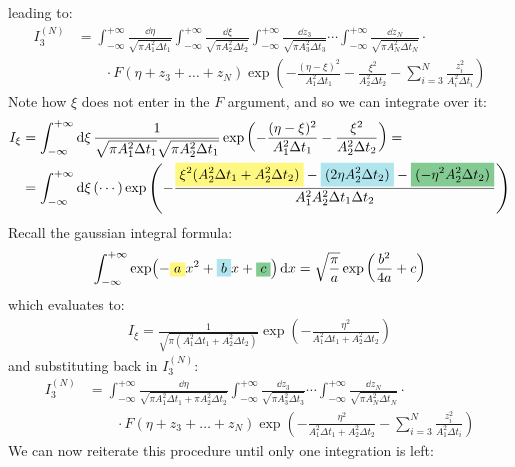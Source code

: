 \documentclass[../template.tex]{subfiles}
\begin{document}
leading to:
\begin{align*}
    I_3^{(N)} &= \int_{-\infty}^{+\infty} \frac{\dd{\eta}}{\sqrt{ \pi A_1^2 \Delta t_1}}\int_{-\infty}^{+\infty} \frac{\dd{\xi}}{\sqrt{ \pi A_2^2 \Delta t_2 }} \int_{-\infty}^{+\infty} \frac{\dd{z_3}}{\sqrt{\pi A_3^2 \Delta t_3}}\cdots \int_{-\infty}^{+\infty} \frac{\dd{z_N}}{\sqrt{\pi A_N^2 \Delta t_N}} \cdot\\
    &\qquad \cdot F(\eta + z_3 + \dots + z_N) \exp\left(-\frac{(\eta-\xi)^2}{A_1^2 \Delta t_1} - \frac{\xi^2}{A_2^2 \Delta t_2} - \sum_{i=3}^N \frac{z_i^2}{A_i^2 \Delta t_i} \right)
\end{align*}
Note how $\xi$ does not enter in the $F$ argument, and so we can integrate over it:
\begin{align*}
    I_\xi &= \int_{-\infty}^{+\infty} \dd{\xi} \frac{1}{\sqrt{\pi A_1^2 \Delta t_1} \sqrt{\pi A_2^2 \Delta t_1 }}\exp\left(-\frac{(\eta - \xi)^2}{A_1^2 \Delta t_1} - \frac{\xi^2}{A_2^2 \Delta t_2} \right) =\\
    &= \int_{-\infty}^{+\infty} \dd{\xi} (\cdots) \exp\left(-\frac{\hlc{Yellow}{\xi^2 (A_2^2 \Delta t_1 + A_2^2 \Delta t_2)} - \hlc{SkyBlue}{(2\eta A_2^2 \Delta t_2)} - \hlc{ForestGreen}{(-\eta^2 A_2^2 \Delta t_2)}}{A_1^2 A_2^2 \Delta t_1 \Delta t_2} \right)
\end{align*}  
Recall the gaussian integral formula:
\begin{align*}
    \int_{-\infty}^{+\infty} \exp(-\hlc{Yellow}{a}x^2 +\hlc{SkyBlue}{ b}x + \hlc{ForestGreen}{c}) \dd{x} = \sqrt{\frac{\pi}{a} } \exp\left(\frac{b^2}{4a} + c \right)
\end{align*}
which evaluates to:
\begin{align*}
    I_\xi = \frac{1}{\sqrt{\pi (A_1^2 \Delta t_1 + A_2^2 \Delta t_2)}} \exp\left(-\frac{\eta^2}{A_1^2 \Delta t_1 + A_2^2 \Delta t_2} \right) 
\end{align*}
and substituting back in $I_3^{(N)}$:
\begin{align*}
    I_3^{(N)} &= \int_{-\infty}^{+\infty} \frac{\dd{\eta}}{\sqrt{\pi A_1^2 \Delta t_1 + \pi A_2^2 \Delta t_2}} \int_{-\infty}^{+\infty} \frac{\dd{z_3}}{\sqrt{ \pi A_3^2 \Delta t_3}} \cdots \int_{-\infty}^{+\infty} \frac{\dd{z_N}}{\sqrt{\pi A_N^2 \Delta t_N }} \cdot  \\
    &\qquad \cdot F(\eta + z_3 + \dots + z_N) \exp\left(-\frac{\eta^2}{A_1^2 \Delta t_1 + A_2^2 \Delta t_2} - \sum_{i=3}^N \frac{z_i^2}{A_1^2 \Delta t_i} \right)
\end{align*} 
We can now reiterate this procedure until only one integration is left:
\end{document}
